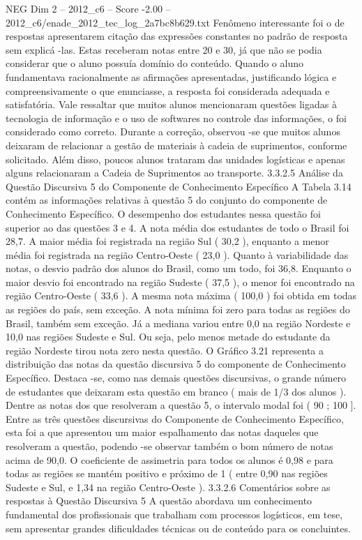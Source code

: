 \begin{textsample}{NEG Dim 2 – 2012\_c6 – Score -2.00 – 2012\_c6/enade\_2012\_tec\_log\_2a7bc8b629.txt}
Fenômeno interessante foi o de respostas apresentarem citação das expressões constantes no padrão de resposta sem explicá -las.
Estas receberam notas entre 20 e 30, já que não se podia considerar que o aluno possuía domínio do conteúdo.
Quando o aluno fundamentava racionalmente as afirmações apresentadas, justificando lógica e compreensivamente o que enunciasse, a resposta foi considerada adequada e satisfatória.
Vale ressaltar que muitos alunos mencionaram questões ligadas à tecnologia de informação e o uso de softwares no controle das informações, o foi considerado como correto.
Durante a correção, observou -se que muitos alunos deixaram de relacionar a gestão de materiais à cadeia de suprimentos, conforme solicitado.
Além disso, poucos alunos trataram das unidades logísticas e apenas alguns relacionaram a Cadeia de Suprimentos ao transporte. 3.3.2.5 Análise da Questão Discursiva 5 do Componente de Conhecimento Específico A Tabela 3.14 contém as informações relativas à questão 5 do conjunto do componente de Conhecimento Específico.
O desempenho dos estudantes nessa questão foi superior ao das questões 3 e 4.
A nota média dos estudantes de todo o Brasil foi 28,7.
A maior média foi registrada na região Sul ( 30,2 ), enquanto a menor média foi registrada na região Centro-Oeste ( 23,0 ).
Quanto à variabilidade das notas, o desvio padrão dos alunos do Brasil, como um todo, foi 36,8.
Enquanto o maior desvio foi encontrado na região Sudeste ( 37,5 ), o menor foi encontrado na região Centro-Oeste ( 33,6 ).
A mesma nota máxima ( 100,0 ) foi obtida em todas as regiões do país, sem exceção.
A nota mínima foi zero para todas as regiões do Brasil, também sem exceção.
Já a mediana variou entre 0,0 na região Nordeste e 10,0 nas regiões Sudeste e Sul.
Ou seja, pelo menos metade do estudante da região Nordeste tirou nota zero nesta questão.
O Gráfico 3.21 representa a distribuição das notas da questão discursiva 5 do componente de Conhecimento Específico.
Destaca -se, como nas demais questões discursivas, o grande número de estudantes que deixaram esta questão em branco ( mais de 1/3 dos alunos ).
Dentre as notas dos que resolveram a questão 5, o intervalo modal foi ( 90 ; 100 ].
Entre as três questões discursivas do Componente de Conhecimento Específico, esta foi a que apresentou um maior espalhamento das notas daqueles que resolveram a questão, podendo -se observar também o bom número de notas acima de 90,0.
O coeficiente de assimetria para todos os alunos é 0,98 e para todas as regiões se mantém positivo e próximo de 1 ( entre 0,90 nas regiões Sudeste e Sul, e 1,34 na região Centro-Oeste ). 3.3.2.6 Comentários sobre as respostas à Questão Discursiva 5 A questão abordava um conhecimento fundamental dos profissionais que trabalham com processos logísticos, em tese, sem apresentar grandes dificuldades técnicas ou de conteúdo para os concluintes.

\end{textsample}
